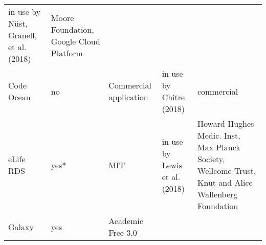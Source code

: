 \documentclass[onecolumn]{article}
\begin{document}
\begin{longtable}[]{@{}lllll@{}}
\begin{minipage}[t]{0.17\columnwidth}
in use by Nüst, Granell, et al. (2018)\strut
\end{minipage} & \begin{minipage}[t]{0.29\columnwidth}\raggedright
Moore Foundation, Google Cloud Platform\strut
\end{minipage}\tabularnewline
\begin{minipage}[t]{0.11\columnwidth}\raggedright
Code Ocean\strut
\end{minipage} & \begin{minipage}[t]{0.11\columnwidth}\raggedright
no\strut
\end{minipage} & \begin{minipage}[t]{0.17\columnwidth}\raggedright
Commercial application\strut
\end{minipage} & \begin{minipage}[t]{0.17\columnwidth}\raggedright
in use by Chitre (2018)\strut
\end{minipage} & \begin{minipage}[t]{0.29\columnwidth}\raggedright
commercial\strut
\end{minipage}\tabularnewline
\begin{minipage}[t]{0.11\columnwidth}\raggedright
eLife RDS\strut
\end{minipage} & \begin{minipage}[t]{0.11\columnwidth}\raggedright
yes*\strut
\end{minipage} & \begin{minipage}[t]{0.17\columnwidth}\raggedright
MIT\strut
\end{minipage} & \begin{minipage}[t]{0.17\columnwidth}\raggedright
in use by Lewis et al. (2018)\strut
\end{minipage} & \begin{minipage}[t]{0.29\columnwidth}\raggedright
Howard Hughes Medic. Inst, Max Planck Society, Wellcome Trust, Knut and
Alice Wallenberg Foundation\strut
\end{minipage}\tabularnewline
\begin{minipage}[t]{0.11\columnwidth}\raggedright
Galaxy\strut
\end{minipage} & \begin{minipage}[t]{0.11\columnwidth}\raggedright
yes\strut
\end{minipage} & \begin{minipage}[t]{0.17\columnwidth}\raggedright
Academic Free 3.0\strut
\end{minipage} & \begin{minipage}[t]{0.17\columnwidth}\raggedright

\end{minipage}
\end{longtable}
\end{document}
